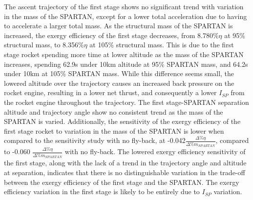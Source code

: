 The ascent trajectory of the first stage shows no significant trend with variation in the mass of the SPARTAN, except for a lower total acceleration due to having to accelerate a larger total mass.
As the structural mass of the SPARTAN is increased, the exergy efficiency of the first stage decreases, from 8.780\%$\eta$ at 95\% structural mass, to 8.356\%$\eta$ at 105\% structural mass. This is due to the first stage rocket spending more time at lower altitude as the mass of the SPARTAN increases, spending 62.9s under 10km altitude at 95\% SPARTAN mass, and 64.2s under 10km at 105\% SPARTAN mass. While this difference seems small, the lowered altitude over the trajectory causes an increased back pressure on the rocket engine, resulting in a lower net thrust, and consequently a lower $I_{SP}$ from the rocket engine throughout the trajectory. 
 The first stage-SPARTAN separation altitude and trajectory angle show no consistent trend as the mass of the SPARTAN is varied. 
 Additionally, the sensitivity of the exergy efficiency of the first stage rocket to variation in the mass of the SPARTAN is lower when compared to the sensitivity study with no fly-back, at -0.042$\frac{\Delta \%\eta}{\Delta\% m_{SPARTAN}}$, compared to -0.060 $\frac{\Delta \%\eta}{\Delta\% m_{SPARTAN}}$ with no fly-back. The lowered exergy efficiency sensitivity of the first stage, along with the lack of a trend in the trajectory angle and altitude at separation, indicates that there is no distinguishable variation in the trade-off between the exergy efficiency of the first stage and the SPARTAN. The exergy efficiency variation in the first stage is likely to be entirely due to $I_{SP}$ variation. 
 
